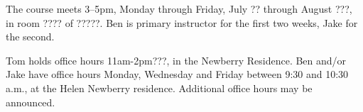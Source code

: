 The course meets 3--5pm, Monday through Friday, July ?? through August
???,  in room ???? of ?????.
Ben is primary instructor for the first
two weeks, Jake for the second.  

Tom holds office hours 11am-2pm???, in the Newberry Residence. %
Ben and/or Jake have office hours Monday, Wednesday and
Friday between 9:30 and 10:30 a.m.,
at the Helen Newberry
residence. %
Additional office hours may be announced. 
